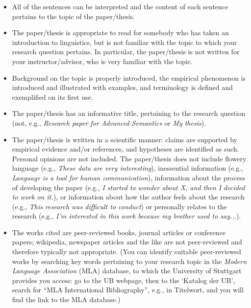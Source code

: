 \documentclass[11pt,fleqn,a4paper/thesis]{article}
\newcommand{\6}{\mbox{$[\hspace*{-.6mm}[$}}
\newcommand{\9}{\mbox{$]\hspace*{-.6mm}]$}}
\begin{document}
\begin{itemize}[itemsep=-1pt,leftmargin=2.5ex,topsep=-2pt]

\item All of the sentences can be interpreted and the content of each sentence pertains to the topic of the paper/thesis.

\item The paper/thesis is appropriate to read for somebody who has taken an introduction to linguistics, but is not familiar with the topic to which your research question pertains. In particular, the paper/thesis is not written for your instructor/advisor, who is very familiar with the topic.

\item Background on the topic is properly introduced, the empirical phenomenon is introduced and illustrated with examples, and terminology is defined and exemplified on its first use. 

\item The paper/thesis has an informative title, pertaining to the research question (not, e.g., {\em Research paper for Advanced Semantics} or {\em My thesis}).

\item The paper/thesis is written in a scientific manner: claims are supported by empirical evidence and/or references, and hypotheses are identified as such. Personal opinions are not included. The paper/thesis does not include flowery language (e.g., {\em These data are very interesting}), inessential information (e.g., {\em Language is a tool for human communication}), information about the process of developing the paper (e.g., {\em I started to wonder about X, and then I decided to work on it.}), or information about how the author feels about the research (e.g., {\em This research was difficult to conduct}) or personally relates to the research (e.g., {\em I'm interested in this work because my brother used to say...}).

\item The works cited are peer-reviewed books, journal articles or conference papers; wikipedia, newspaper articles and the like are not peer-reviewed and therefore typically not appropriate. (You can identify suitable peer-reviewed works by searching key words pertaining to your research topic in the {\em Modern Language Association} (MLA) database, to which the University of Stuttgart provides you access: go to the UB webpage, then to the `Katalog  der UB', search for ``MLA International Bibliography'', e.g., in Titelwort, and you will find the link to the MLA database.)


\end{itemize}
\end{document}
